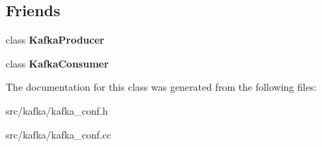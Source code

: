 \subsection*{Friends}
\begin{DoxyCompactItemize}
\item 
class {\bfseries Kafka\+Producer}\hypertarget{classlog2hdfs_1_1KafkaTopicConf_a25501737c09078d7d152ac5ba415f843}{}\label{classlog2hdfs_1_1KafkaTopicConf_a25501737c09078d7d152ac5ba415f843}

\item 
class {\bfseries Kafka\+Consumer}\hypertarget{classlog2hdfs_1_1KafkaTopicConf_a6333789304ef25919eff3559a1e12c36}{}\label{classlog2hdfs_1_1KafkaTopicConf_a6333789304ef25919eff3559a1e12c36}

\end{DoxyCompactItemize}


The documentation for this class was generated from the following files\+:\begin{DoxyCompactItemize}
\item 
src/kafka/kafka\+\_\+conf.\+h\item 
src/kafka/kafka\+\_\+conf.\+cc\end{DoxyCompactItemize}
